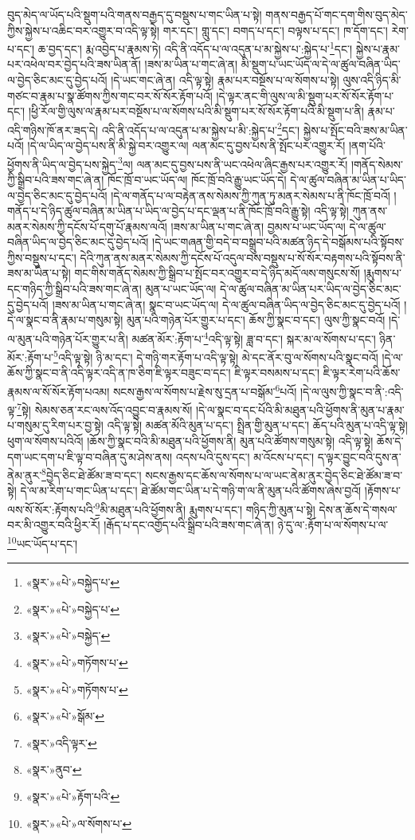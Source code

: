 བུད་མེད་ལ་ཡོད་པའི་སྡུག་པའི་གནས་བརྒྱད་དུ་བསྡུས་པ་གང་ཡིན་པ་སྟེ། གནས་བརྒྱད་པོ་གང་དག་གིས་བུད་མེད་ཀྱིས་སྐྱེས་པ་འཆིང་བར་འགྱུར་བ་འདི་ལྟ་སྟེ། གར་དང་། གླུ་དང་། བགད་པ་དང་། བལྟས་པ་དང་། ཁ་དོག་དང་། རེག་པ་དང་། ཆ་བྱད་དང་། རྨ་འབྱེད་པ་རྣམས་ཏེ། འདི་ནི་འདོད་པ་ལ་འདུན་པ་མ་སྐྱེས་པ་:སྐྱེད་པ་\footnote{«སྣར་»«པེ་»བསྐྱེད་པ་}དང་། སྐྱེས་པ་རྣམ་པར་འཕེལ་བར་བྱེད་པའི་ཟས་ཡིན་ནོ། །ཟས་མ་ཡིན་པ་གང་ཞེ་ན། མི་སྡུག་པ་ཡང་ཡོད་ལ་དེ་ལ་ཚུལ་བཞིན་ཡིད་ལ་བྱེད་ཅིང་མང་དུ་བྱེད་པའོ། །དེ་ཡང་གང་ཞེ་ན། འདི་ལྟ་སྟེ། རྣམ་པར་བསྔོས་པ་ལ་སོགས་པ་སྟེ། ལུས་འདི་ཉིད་མི་གཙང་བ་རྣམ་པ་སྣ་ཚོགས་ཀྱིས་གང་བར་སོ་སོར་རྟོག་པའོ། །དེ་ལྟར་ནང་གི་ལུས་ལ་མི་སྡུག་པར་སོ་སོར་རྟོག་པ་དང་། །ཕྱི་རོལ་གྱི་ལུས་ལ་རྣམ་པར་བསྔོས་པ་ལ་སོགས་པའི་མི་སྡུག་པར་སོ་སོར་རྟོག་པའི་མི་སྡུག་པ་ནི། རྣམ་པ་འདི་གཉིས་ཁོ་ནར་ཟད་དེ། འདི་ནི་འདོད་པ་ལ་འདུན་པ་མ་སྐྱེས་པ་མི་:སྐྱེད་པ་\footnote{«སྣར་»«པེ་»བསྐྱེད་པ་}དང་། སྐྱེས་པ་སྤོང་བའི་ཟས་མ་ཡིན་པའོ། །དེ་ལ་ཡིད་ལ་བྱེད་པས་ནི་མི་སྐྱེ་བར་འགྱུར་ལ། ལན་མང་དུ་བྱས་པས་ནི་སྤོང་པར་འགྱུར་རོ། །ནག་པོའི་ཕྱོགས་ནི་ཡིད་ལ་བྱེད་པས་སྐྱེད་\footnote{«སྣར་»«པེ་»བསྐྱེད་}ལ། ལན་མང་དུ་བྱས་པས་ནི་ཡང་འཕེལ་ཞིང་རྒྱས་པར་འགྱུར་རོ། །གནོད་སེམས་ཀྱི་སྒྲིབ་པའི་ཟས་གང་ཞེ་ན། ཁོང་ཁྲོ་བ་ཡང་ཡོད་ལ། ཁོང་ཁྲོ་བའི་རྒྱུ་ཡང་ཡོད་དེ། དེ་ལ་ཚུལ་བཞིན་མ་ཡིན་པ་ཡིད་ལ་བྱེད་ཅིང་མང་དུ་བྱེད་པའོ། །དེ་ལ་གནོད་པ་ལ་བརྟེན་ནས་སེམས་ཀྱི་ཀུན་ཏུ་མནར་སེམས་པ་ནི་ཁོང་ཁྲོ་བའོ། །གནོད་པ་དེ་ཉིད་ཚུལ་བཞིན་མ་ཡིན་པ་ཡིད་ལ་བྱེད་པ་དང་ལྡན་པ་ནི་ཁོང་ཁྲོ་བའི་རྒྱུ་སྟེ། འདི་ལྟ་སྟེ། ཀུན་ནས་མནར་སེམས་ཀྱི་དངོས་པོ་དགུ་པོ་རྣམས་ལའོ། །ཟས་མ་ཡིན་པ་གང་ཞེ་ན། བྱམས་པ་ཡང་ཡོད་ལ། དེ་ལ་ཚུལ་བཞིན་ཡིད་ལ་བྱེད་ཅིང་མང་དུ་བྱེད་པའོ། །དེ་ཡང་གཞན་གྱི་བདེ་བ་བསྒྲུབ་པའི་མཚན་ཉིད་དེ་བསྒོམས་པའི་སྟོབས་ཀྱིས་བསྡུས་པ་དང་། དེའི་ཀུན་ནས་མནར་སེམས་ཀྱི་དངོས་པོ་འདུལ་བས་བསྡུས་པ་སོ་སོར་བརྟགས་པའི་སྟོབས་ནི་ཟས་མ་ཡིན་པ་སྟེ། གང་གིས་གནོད་སེམས་ཀྱི་སྒྲིབ་པ་སྤོང་བར་འགྱུར་བ་དེ་ཉིད་མདོ་ལས་གསུངས་སོ། །རྨུགས་པ་དང་གཉིད་ཀྱི་སྒྲིབ་པའི་ཟས་གང་ཞེ་ན། མུན་པ་ཡང་ཡོད་ལ། དེ་ལ་ཚུལ་བཞིན་མ་ཡིན་པར་ཡིད་ལ་བྱེད་ཅིང་མང་དུ་བྱེད་པའོ། །ཟས་མ་ཡིན་པ་གང་ཞེ་ན། སྣང་བ་ཡང་ཡོད་ལ། དེ་ལ་ཚུལ་བཞིན་ཡིད་ལ་བྱེད་ཅིང་མང་དུ་བྱེད་པའོ། །དེ་ལ་སྣང་བ་ནི་རྣམ་པ་གསུམ་སྟེ། མུན་པའི་གཉེན་པོར་གྱུར་པ་དང་། ཆོས་ཀྱི་སྣང་བ་དང་། ལུས་ཀྱི་སྣང་བའོ། །དེ་ལ་མུན་པའི་གཉེན་པོར་གྱུར་པ་ནི། མཚན་མོར་:རྟོག་པ་\footnote{«སྣར་»«པེ་»གཏོགས་པ་}འདི་ལྟ་སྟེ། ཟླ་བ་དང་། སྐར་མ་ལ་སོགས་པ་དང་། ཉིན་མོར་:རྟོག་པ་\footnote{«སྣར་»«པེ་»གཏོགས་པ་}འདི་ལྟ་སྟེ། ཉི་མ་དང་། དེ་གཉི་གར་རྟོག་པ་འདི་ལྟ་སྟེ། མེ་དང་ནོར་བུ་ལ་སོགས་པའི་སྣང་བའོ། །དེ་ལ་ཆོས་ཀྱི་སྣང་བ་ནི་འདི་ལྟར་འདི་ན་ཁ་ཅིག་ཇི་ལྟར་བཟུང་བ་དང་། ཇི་ལྟར་བསམས་པ་དང་། ཇི་ལྟར་རེག་པའི་ཆོས་རྣམས་ལ་སོ་སོར་རྟོག་པའམ། སངས་རྒྱས་ལ་སོགས་པ་རྗེས་སུ་དྲན་པ་བསྒོམ་\footnote{«སྣར་»«པེ་»སྒོམ་}པའོ། །དེ་ལ་ལུས་ཀྱི་སྣང་བ་ནི་:འདི་ལྟ་\footnote{«སྣར་»འདི་ལྟར་}སྟེ། སེམས་ཅན་རང་ལས་འོད་འབྱུང་བ་རྣམས་སོ། །དེ་ལ་སྣང་བ་དང་པོའི་མི་མཐུན་པའི་ཕྱོགས་ནི་མུན་པ་རྣམ་པ་གསུམ་དུ་རིག་པར་བྱ་སྟེ། འདི་ལྟ་སྟེ། མཚན་མོའི་མུན་པ་དང་། སྤྲིན་གྱི་མུན་པ་དང་། ཆོད་པའི་མུན་པ་འདི་ལྟ་སྟེ། ཕུག་ལ་སོགས་པའིའོ། །ཆོས་ཀྱི་སྣང་བའི་མི་མཐུན་པའི་ཕྱོགས་ནི། མུན་པའི་ཚོགས་གསུམ་སྟེ། འདི་ལྟ་སྟེ། ཆོས་དེ་དག་ཡང་དག་པ་ཇི་ལྟ་བ་བཞིན་དུ་མ་ཤེས་ནས། འདས་པའི་དུས་དང་། མ་འོངས་པ་དང་། ད་ལྟར་བྱུང་བའི་དུས་ན་ནེམ་ནུར་\footnote{«སྣར་»ནུབ་}བྱེད་ཅིང་ཐེ་ཚོམ་ཟ་བ་དང་། སངས་རྒྱས་དང་ཆོས་ལ་སོགས་པ་ལ་ཡང་ནེམ་ནུར་བྱེད་ཅིང་ཐེ་ཚོམ་ཟ་བ་སྟེ། དེ་ལ་མ་རིག་པ་གང་ཡིན་པ་དང་། ཐེ་ཚོམ་གང་ཡིན་པ་དེ་གཉི་ག་ལ་ནི་མུན་པའི་ཚོགས་ཞེས་བྱའོ། །རྟོགས་པ་ལས་སོ་སོར་:རྟོགས་པའི་\footnote{«སྣར་»«པེ་»རྟོག་པའི་}མི་མཐུན་པའི་ཕྱོགས་ནི། རྨུགས་པ་དང་། གཉིད་ཀྱི་མུན་པ་སྟེ། དེས་ན་ཆོས་དེ་གསལ་བར་མི་འགྱུར་བའི་ཕྱིར་རོ། །རྒོད་པ་དང་འགྱོད་པའི་སྒྲིབ་པའི་ཟས་གང་ཞེ་ན། ཉེ་དུ་ལ་:རྟོག་པ་ལ་སོགས་པ་ལ་\footnote{«སྣར་»«པེ་»ལ་སོགས་པ་}ཡང་ཡོད་པ་དང་། 